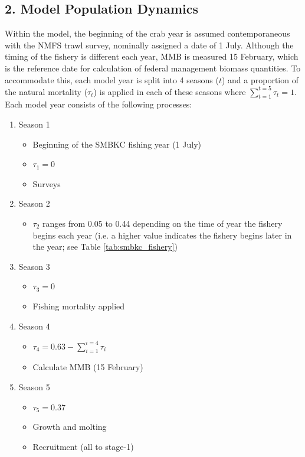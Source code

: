 \documentclass[]{article}
\begin{document}
\subsection{2. Model Population
Dynamics}\label{model-population-dynamics}

Within the model, the beginning of the crab year is assumed
contemporaneous with the NMFS trawl survey, nominally assigned a date of
1 July. Although the timing of the fishery is different each year, MMB
is measured 15 February, which is the reference date for calculation of
federal management biomass quantities. To accommodate this, each model
year is split into 4 seasons (\(t\)) and a proportion of the natural
mortality (\(\tau_t\)) is applied in each of these seasons where
\(\sum_{t=1}^{t=5} \tau_t = 1\). Each model year consists of the
following processes:

\begin{enumerate}
    \item Season 1
    \begin{itemize}
        \item Beginning of the SMBKC fishing year (1 July)
        \item $\tau_1 = 0$
        \item Surveys
    \end{itemize}
    \item Season 2
    \begin{itemize}
        \item $\tau_2$ ranges from 0.05 to 0.44 depending on the time of year the fishery begins each year (i.e. a higher value indicates the fishery begins later in the year; see Table \ref{tab:smbkc_fishery})
    \end{itemize}
    \item Season 3
    \begin{itemize}
        \item $\tau_3 = 0$
        \item Fishing mortality applied
    \end{itemize}
    \item Season 4
    \begin{itemize}
        \item $\tau_4 = 0.63 - \sum_{i=1}^{i=4} \tau_i$
        \item Calculate MMB (15 February)
    \end{itemize}
    \item Season 5
    \begin{itemize}
        \item $\tau_5 = 0.37$
        \item Growth and molting
        \item Recruitment (all to stage-1)
    \end{itemize}
\end{enumerate}
\end{document}
